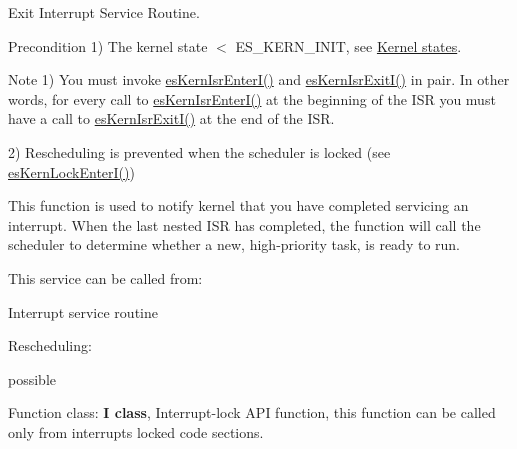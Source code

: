 Exit Interrupt Service Routine. 

\begin{DoxyPrecond}{Precondition}
1) {\ttfamily The kernel state $<$ E\-S\-\_\-\-K\-E\-R\-N\-\_\-\-I\-N\-I\-T}, see \hyperlink{states}{Kernel states}. 
\end{DoxyPrecond}
\begin{DoxyNote}{Note}
1) You must invoke \hyperlink{group__kern__general_gac0d578bcd4a10b2c8e5fc90f0b86ccec}{es\-Kern\-Isr\-Enter\-I()} and \hyperlink{group__kern__general_gaa6347925fff1684b5425dd2857c27129}{es\-Kern\-Isr\-Exit\-I()} in pair. In other words, for every call to \hyperlink{group__kern__general_gac0d578bcd4a10b2c8e5fc90f0b86ccec}{es\-Kern\-Isr\-Enter\-I()} at the beginning of the I\-S\-R you must have a call to \hyperlink{group__kern__general_gaa6347925fff1684b5425dd2857c27129}{es\-Kern\-Isr\-Exit\-I()} at the end of the I\-S\-R. 

2) Rescheduling is prevented when the scheduler is locked (see \hyperlink{group__kern__lock_ga6dd45355c20a10f7272bd39670353428}{es\-Kern\-Lock\-Enter\-I()})
\end{DoxyNote}
This function is used to notify kernel that you have completed servicing an interrupt. When the last nested I\-S\-R has completed, the function will call the scheduler to determine whether a new, high-\/priority task, is ready to run. \begin{DoxyParagraph}{This service can be called from\-:}

\begin{DoxyItemize}
\item Interrupt service routine 
\end{DoxyItemize}
\end{DoxyParagraph}
\begin{DoxyParagraph}{Rescheduling\-:}

\begin{DoxyItemize}
\item possible 
\end{DoxyItemize}
\end{DoxyParagraph}
\begin{DoxyParagraph}{Function class\-:}
{\bfseries I class}, Interrupt-\/lock A\-P\-I function, this function can be called only from interrupts locked code sections. 
\end{DoxyParagraph}
